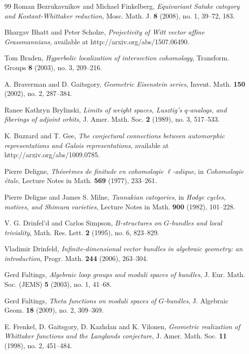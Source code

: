 \begin{thebibliography}{99}
 Roman Bezrukavnikov and Michael Finkelberg, \emph{Equivariant Satake category and Kostant-Whittaker reduction}, Mosc. Math. J. \textbf{8} (2008), no. 1, 39--72, 183.

 Bhargav Bhatt and Peter Scholze, \emph{Projectivity of Witt vector affine Grassmannians}, available at http://arxiv.org/abs/1507.06490.

 Tom Braden, \emph{Hyperbolic localization of intersection cohomology}, Transform. Groups \textbf{8} (2003), no. 3, 209--216.

 A. Braverman and D. Gaitsgory, \emph{Geometric Eisenstein series}, Invent. Math. \textbf{150} (2002), no. 2, 287--384.

 Ranee Kathryn Brylinski, \emph{Limits of weight spaces, Lusztig's $q$-analogs, and fiberings of adjoint orbits}, J. Amer. Math. Soc. \textbf{2} (1989), no. 3, 517--533.

 K. Buzzard and T. Gee, \emph{The conjectural connections between automorphic representations and Galois representations}, available at http://arxiv.org/abs/1009.0785.

 Pierre Deligne, \emph{Th\'eor\`emes de finitude en cohomologie $\ell$-adique}, in \emph{Cohomologie \'etale}, Lecture Notes in Math. \textbf{569} (1977), 233--261.

 Pierre Deligne and James S. Milne, \emph{Tannakian categories}, in \emph{Hodge cycles, motives, and Shimura varieties}, Lecture Notes in Math. \textbf{900} (1982), 101--228.

 V. G. Drinfel'd and Carlos Simpson, \emph{$B$-structures on $G$-bundles and local triviality}, Math. Res. Lett. \textbf{2} (1995), no. 6, 823--829.

 Vladimir Drinfeld, \emph{Infinite-dimensional vector bundles in algebraic geometry: an introduction}, Progr. Math. \textbf{244} (2006), 263--304.

 Gerd Faltings, \emph{Algebraic loop groups and moduli spaces of bundles}, J. Eur. Math. Soc. (JEMS) \textbf{5} (2003), no. 1, 41--68.

 Gerd Faltings, \emph{Theta functions on moduli spaces of $G$-bundles}, J. Algebraic Geom. \textbf{18} (2009), no. 2, 309--369.

 E. Frenkel, D. Gaitsgory, D. Kazhdan and K. Vilonen, \emph{Geometric realization of Whittaker functions and the Langlands conjecture}, J. Amer. Math. Soc. \textbf{11} (1998), no. 2, 451--484.


\end{thebibliography}

